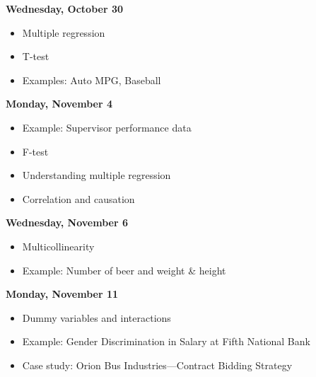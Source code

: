 \documentclass[11pt]{article}
\begin{document}
\vspace{5mm}
\noindent\textbf{\large Wednesday, October 30} 	



\begin{itemize}

\item Multiple regression
\item T-test 
\item Examples: Auto MPG, Baseball
\end{itemize}



\vspace{5mm}
\noindent\textbf{\large Monday, November 4} 	
%






\begin{itemize}
\item Example: Supervisor performance data
\item F-test
\item Understanding multiple regression
\item Correlation and causation

\end{itemize}

%
\vspace{7mm}
\noindent\textbf{\large Wednesday, November 6} 	


\begin{itemize}
\item Multicollinearity
\item Example: Number of beer and weight \& height 


\end{itemize}

\vspace{5mm}
\noindent\textbf{\large Monday, November 11} 	


\begin{itemize}

\item Dummy variables and interactions
\item Example: Gender Discrimination in Salary at Fifth National Bank
\item Case study: Orion Bus Industries---Contract Bidding Strategy



\end{itemize}
\end{document}
